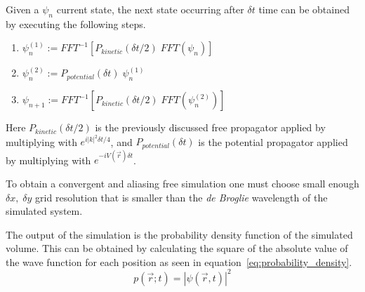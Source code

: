 Given a $\psi_n$ current state, the next state occurring after $\delta{}t$ time can be obtained by executing the following steps.
\begin{enumerate}
	\item{$\psi_n^{(1)} := FFT^{-1}\left[ P_{kinetic}(\delta{}t/2)\;FFT(\psi_n) \right]$}
	\item{$\psi_n^{(2)} := P_{potential}(\delta{}t)\;\psi_n^{(1)}$}
	\item{$\psi_{n+1} := FFT^{-1}\left[ P_{kinetic}(\delta{}t/2)\;FFT(\psi_n^{(2)}) \right]$}
\end{enumerate}
Here $P_{kinetic}(\delta{}t/2)$ is the previously discussed free propagator applied by multiplying with $e^{i|k|^2\delta{}t/4}$, and $P_{potential}(\delta{}t)$ is the potential propagator applied by multiplying with $e^{-iV(\vec{r})\delta{}t}$.

To obtain a convergent and aliasing free simulation one must choose small enough $\delta{}x,\; \delta{}y$ grid resolution that is smaller than the \textit{de Broglie} wavelength of the simulated system.

The output of the simulation is the probability density function of the simulated volume.
This can be obtained by calculating the square of the absolute value of the wave function for each position as seen in equation~\ref{eq:probability_density}.
\begin{equation}
	\label{eq:probability_density}
	p(\vec{r}; t) = |\psi(\vec{r}, t)|^2
\end{equation}



